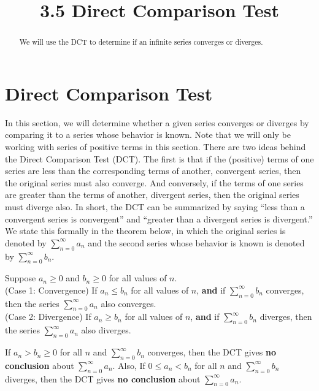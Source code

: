 \documentclass{ximera}
\title{3.5 Direct Comparison Test}
\begin{document}
\begin{abstract}
We will use the DCT to determine if an infinite series converges or diverges.
\end{abstract}

\maketitle

\section{Direct Comparison Test}

In this section, we will determine whether a given series converges or diverges by comparing it to a series whose behavior is known.
Note that we will only be working with series of positive terms in this section. There are two ideas behind the Direct Comparison Test (DCT).
The first is that if the (positive) terms of one series are less than the corresponding terms of another, 
convergent series, then the original series must also converge. And conversely, if the terms of one series are greater than 
the terms of another, divergent series, then the original series must diverge also.
In short, the DCT can be summarized by saying ``less than a convergent series is convergent''
and ``greater than a divergent series is divergent.''
We state this formally in the theorem below, in which the original series is denoted by $\displaystyle{\sum_{n=0}^\infty a_n}$ 
and the second series whose behavior is known is denoted by $\displaystyle{\sum_{n=0}^\infty b_n}$.


\begin{theorem}
 Suppose $a_n \geq 0$ and $b_n \geq 0$ for all values of $n$.\\
(Case 1: Convergence) If $a_n \leq b_n$ for all values of $n$, \textbf{and} if $\displaystyle{\sum_{n=0}^\infty b_n}$ converges, 
then the series $\displaystyle{\sum_{n=0}^\infty a_n}$ also converges.\\
(Case 2: Divergence) If $a_n \geq b_n$ for all values of $n$, \textbf{and} if $\displaystyle{\sum_{n=0}^\infty b_n}$ diverges, 
then the series $\displaystyle{\sum_{n=0}^\infty a_n}$ also diverges.
\end{theorem}


\begin{remark}
If $a_n > b_n \geq 0$ for all $n$ and $\displaystyle{\sum_{n=0}^\infty b_n}$ converges, then the DCT gives \textbf{no conclusion} about $\displaystyle{\sum_{n=0}^\infty a_n}$.
Also, If $0 \leq a_n < b_n$ for all $n$ and $\displaystyle{\sum_{n=0}^\infty b_n}$ diverges, then the DCT gives \textbf{no conclusion} about $\displaystyle{\sum_{n=0}^\infty a_n}$.
\end{remark}
\end{document}

